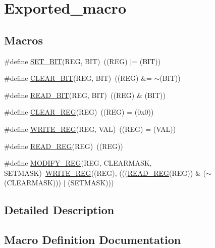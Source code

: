 \hypertarget{group___exported__macro}{}\section{Exported\+\_\+macro}
\label{group___exported__macro}
\subsection*{Macros}
\begin{DoxyCompactItemize}
\item 
\#define \mbox{\hyperlink{group___exported__macro_ga26474f43799fbade9cf300e21dd3a91a}{S\+E\+T\+\_\+\+B\+IT}}(R\+EG,  B\+IT)~((R\+EG) $\vert$= (B\+IT))
\item 
\#define \mbox{\hyperlink{group___exported__macro_ga133aae6fc0d41bffab39ab223a7001de}{C\+L\+E\+A\+R\+\_\+\+B\+IT}}(R\+EG,  B\+IT)~((R\+EG) \&= $\sim$(B\+IT))
\item 
\#define \mbox{\hyperlink{group___exported__macro_ga822bb1bb9710d5f2fa6396b84e583c33}{R\+E\+A\+D\+\_\+\+B\+IT}}(R\+EG,  B\+IT)~((R\+EG) \& (B\+IT))
\item 
\#define \mbox{\hyperlink{group___exported__macro_ga1378fbdda39f40b85420df55f41460ef}{C\+L\+E\+A\+R\+\_\+\+R\+EG}}(R\+EG)~((R\+EG) = (0x0))
\item 
\#define \mbox{\hyperlink{group___exported__macro_ga32f78bffcaf6d13023dcd7f05e0c4d57}{W\+R\+I\+T\+E\+\_\+\+R\+EG}}(R\+EG,  V\+AL)~((R\+EG) = (V\+AL))
\item 
\#define \mbox{\hyperlink{group___exported__macro_gae7f188a4d26c9e713a48414783421071}{R\+E\+A\+D\+\_\+\+R\+EG}}(R\+EG)~((R\+EG))
\item 
\#define \mbox{\hyperlink{group___exported__macro_ga6553c99f510c3bab8cc0a91602053247}{M\+O\+D\+I\+F\+Y\+\_\+\+R\+EG}}(R\+EG,  C\+L\+E\+A\+R\+M\+A\+SK,  S\+E\+T\+M\+A\+SK)~\mbox{\hyperlink{group___exported__macro_ga32f78bffcaf6d13023dcd7f05e0c4d57}{W\+R\+I\+T\+E\+\_\+\+R\+EG}}((R\+EG), (((\mbox{\hyperlink{group___exported__macro_gae7f188a4d26c9e713a48414783421071}{R\+E\+A\+D\+\_\+\+R\+EG}}(R\+EG)) \& ($\sim$(C\+L\+E\+A\+R\+M\+A\+SK))) $\vert$ (S\+E\+T\+M\+A\+SK)))
\end{DoxyCompactItemize}


\subsection{Detailed Description}


\subsection{Macro Definition Documentation}
\mbox{\label{group___exported__macro_ga133aae6fc0d41bffab39ab223a7001de}} 
